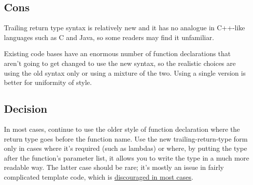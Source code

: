\subsection{Cons}
Trailing return type syntax is relatively new and it has no analogue in C++-like languages such as C and Java, so some readers may find it unfamiliar.

Existing code bases have an enormous number of function declarations that aren't going to get changed to use the new syntax, so the realistic choices are using the old syntax only or using a mixture of the two. Using a single version is better for uniformity of style.

\subsection{Decision}
In most cases, continue to use the older style of function declaration where the return type goes before the function name. Use the new trailing-return-type form only in cases where it's required (such as lambdas) or where, by putting the type after the function's parameter list, it allows you to write the type in a much more readable way. The latter case should be rare; it's mostly an issue in fairly complicated template code, which is \hyperref[sec:template-metaprogramming]{discouraged in most cases}.
